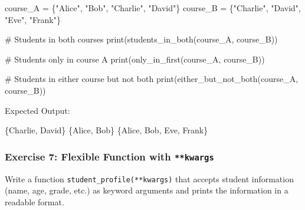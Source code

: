 \documentclass[
  letterpaper,
  DIV=11,
  numbers=noendperiod]{scrreprt}
\newenvironment{Shaded}{\begin{snugshade}}{\end{snugshade}}
\newcommand{\BuiltInTok}[1]{\textcolor[rgb]{0.00,0.23,0.31}{#1}}
\newcommand{\CommentTok}[1]{\textcolor[rgb]{0.37,0.37,0.37}{#1}}
\newcommand{\NormalTok}[1]{\textcolor[rgb]{0.00,0.23,0.31}{#1}}
\newcommand{\OperatorTok}[1]{\textcolor[rgb]{0.37,0.37,0.37}{#1}}
\newcommand{\StringTok}[1]{\textcolor[rgb]{0.13,0.47,0.30}{#1}}
\begin{document}
\begin{Shaded}
\begin{Highlighting}[]
\NormalTok{course\_A }\OperatorTok{=}\NormalTok{ \{}\StringTok{"Alice"}\NormalTok{, }\StringTok{"Bob"}\NormalTok{, }\StringTok{"Charlie"}\NormalTok{, }\StringTok{"David"}\NormalTok{\}}
\NormalTok{course\_B }\OperatorTok{=}\NormalTok{ \{}\StringTok{"Charlie"}\NormalTok{, }\StringTok{"David"}\NormalTok{, }\StringTok{"Eve"}\NormalTok{, }\StringTok{"Frank"}\NormalTok{\}}

\CommentTok{\# Students in both courses}
\BuiltInTok{print}\NormalTok{(students\_in\_both(course\_A, course\_B))}

\CommentTok{\# Students only in course A}
\BuiltInTok{print}\NormalTok{(only\_in\_first(course\_A, course\_B))}

\CommentTok{\# Students in either course but not both}
\BuiltInTok{print}\NormalTok{(either\_but\_not\_both(course\_A, course\_B))}
\end{Highlighting}
\end{Shaded}

Expected Output:

\begin{Shaded}
\begin{Highlighting}[]
\NormalTok{\{}\StringTok{\textquotesingle{}Charlie\textquotesingle{}}\NormalTok{, }\StringTok{\textquotesingle{}David\textquotesingle{}}\NormalTok{\}}
\NormalTok{\{}\StringTok{\textquotesingle{}Alice\textquotesingle{}}\NormalTok{, }\StringTok{\textquotesingle{}Bob\textquotesingle{}}\NormalTok{\}}
\NormalTok{\{}\StringTok{\textquotesingle{}Alice\textquotesingle{}}\NormalTok{, }\StringTok{\textquotesingle{}Bob\textquotesingle{}}\NormalTok{, }\StringTok{\textquotesingle{}Eve\textquotesingle{}}\NormalTok{, }\StringTok{\textquotesingle{}Frank\textquotesingle{}}\NormalTok{\}}
\end{Highlighting}
\end{Shaded}

\hypertarget{exercise-7-flexible-function-with-kwargs}{%
\subsubsection{\texorpdfstring{Exercise 7: Flexible Function with
\texttt{**kwargs}}{Exercise 7: Flexible Function with **kwargs}}\label{exercise-7-flexible-function-with-kwargs}}

Write a function \texttt{student\_profile(**kwargs)} that accepts
student information (name, age, grade, etc.) as keyword arguments and
prints the information in a readable format.
\end{document}
